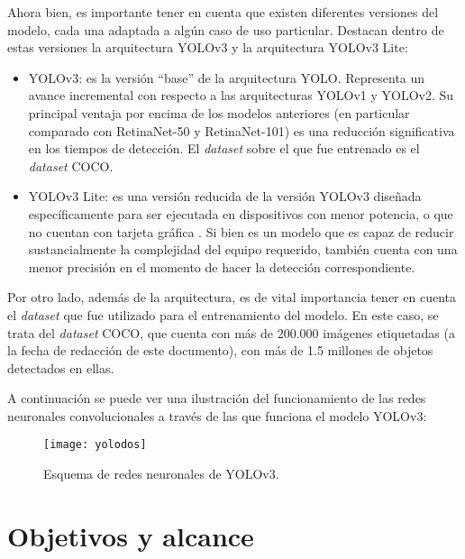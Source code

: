 Ahora bien, es importante tener en cuenta que existen diferentes versiones del modelo, cada una adaptada a algún caso de uso particular. Destacan dentro de estas versiones la arquitectura YOLOv3 y la arquitectura YOLOv3 Lite:

\begin{itemize}
	\item YOLOv3: es la versión “base” de la arquitectura YOLO. Representa un avance incremental con respecto a las arquitecturas YOLOv1 y YOLOv2. Su principal ventaja por encima de los modelos anteriores (en particular comparado con RetinaNet-50 y RetinaNet-101) es una reducción significativa en los tiempos de detección. El \textit{dataset} sobre el que fue entrenado es el \textit{dataset} COCO.
	
	\item YOLOv3 Lite: es una versión reducida de la versión YOLOv3  diseñada específicamente para ser ejecutada en dispositivos con menor potencia, o que no cuentan con tarjeta gráfica \cite{6}. Si bien es un modelo que es capaz de reducir sustancialmente la complejidad del equipo requerido, también cuenta con una menor precisión en el momento de hacer la detección correspondiente. 

\end{itemize}

Por otro lado, además de la arquitectura, es de vital importancia tener en cuenta el \textit{dataset} que fue utilizado para el entrenamiento del modelo. En este caso, se trata del \textit{dataset} COCO, que cuenta con más de 200.000 imágenes etiquetadas (a la fecha de redacción de este documento), con más de 1.5 millones de objetos detectados en ellas. \cite{3}

A continuación se puede ver una ilustración del funcionamiento de las redes neuronales convolucionales a través de las que funciona el modelo YOLOv3:

\begin{figure}[!ht]
    \centering
    \texttt{[image: yolodos]}
    \caption{Esquema de redes neuronales de YOLOv3.\protect\footnotemark}
    \label{fig:mesh1}
\end{figure}



\section{Objetivos y alcance}


